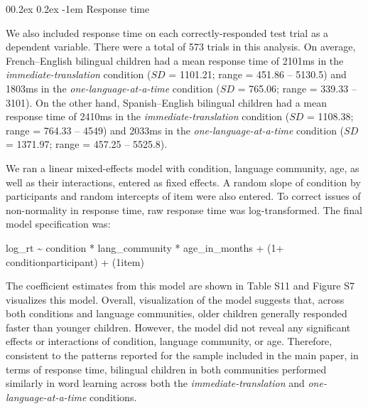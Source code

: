 \documentclass[
  man,floatsintext]{apa7}
\makeatletter
\let\oldparagraph\paragraph
\renewcommand{\paragraph}[1]{\oldparagraph{#1}\mbox{}}
\renewcommand{\paragraph}{\@startsection{paragraph}{4}{\parindent}%
  {0\baselineskip \@plus 0.2ex \@minus 0.2ex}%
  {-1em}%
  {\normalfont\normalsize\bfseries\itshape\typesectitle}}
\renewcommand{\paragraph}{\@startsection{paragraph}{4}{\parindent}%
  {0\baselineskip \@plus 0.2ex \@minus 0.2ex}%
  {-1em}%
  {\normalfont\normalsize\bfseries\typesectitle}}
\makeatother
\begin{document}
\hypertarget{response-time-1}{%
\paragraph{Response time}\label{response-time-1}}

We also included response time on each correctly-responded test trial as a dependent variable. There were a total of 573 trials in this analysis. On average, French--English bilingual children had a mean response time of 2101ms in the \emph{immediate-translation} condition (\(SD\) = 1101.21; range = 451.86 -- 5130.5) and 1803ms in the \emph{one-language-at-a-time} condition (\(SD\) = 765.06; range = 339.33 -- 3101). On the other hand, Spanish--English bilingual children had a mean response time of 2410ms in the \emph{immediate-translation} condition (\(SD\) = 1108.38; range = 764.33 -- 4549) and 2033ms in the \emph{one-language-at-a-time} condition (\(SD\) = 1371.97; range = 457.25 -- 5525.8).

We ran a linear mixed-effects model with condition, language community, age, as well as their interactions, entered as fixed effects. A random slope of condition by participants and random intercepts of item were also entered. To correct issues of non-normality in response time, raw response time was log-transformed. The final model specification was:

log\_rt \textasciitilde{} condition * lang\_community * age\_in\_months + (1+ condition\textbar participant) + (1\textbar item)

\noindent The coefficient estimates from this model are shown in Table S11 and Figure S7 visualizes this model. Overall, visualization of the model suggests that, across both conditions and language communities, older children generally responded faster than younger children. However, the model did not reveal any significant effects or interactions of condition, language community, or age. Therefore, consistent to the patterns reported for the sample included in the main paper, in terms of response time, bilingual children in both communities performed similarly in word learning across both the \emph{immediate-translation} and \emph{one-language-at-a-time} conditions.
\end{document}
